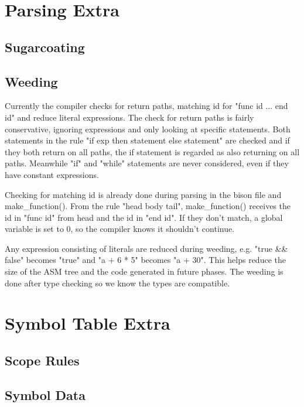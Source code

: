 \documentclass{article}
\begin{document}
\section{Parsing Extra}
\subsection{Sugarcoating}

\subsection{Weeding}
Currently the compiler checks for return paths, matching id for "func id ... end id" and reduce literal expressions. The check for return paths is fairly conservative, ignoring expressions and only looking at specific statements. Both statements in the rule "if exp then statement else statement" are checked and if they both return on all paths, the if statement is regarded as also returning on all paths. Meanwhile "if" and "while" statements are never considered, even if they have constant expressions. 

Checking for matching id is already done during parsing in the bison file and make\_function(). From the rule "head body tail", make\_function() receives the id in "func id" from head and the id in "end id". If they don't match, a global variable is set to 0, so the compiler knows it shouldn't continue.

Any expression consisting of literals are reduced during weeding, e.g. "true \&\& false" becomes "true" and "a + 6 * 5" becomes "a + 30". This helps reduce the size of the ASM tree and the code generated in future phases. The weeding is done after type checking so we know the types are compatible.
\section{Symbol Table Extra}
\subsection{Scope Rules}


\subsection{Symbol Data}
\end{document}
